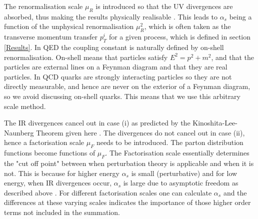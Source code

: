 \documentclass[12pt, onecolumn]{revtex4}    %
\begin{document}
The renormalisation scale ${\mu_R}$ is introduced so that the UV divergences are absorbed, thus making the results physically realisable \cite{PHD}. This leads to ${\alpha _s}$ being a function of the unphysical renormalisation ${\mu_R^2}$, which is often taken as the transverse momentum transfer ${p_T^i}$ for a given process, which is defined in section \ref{Results}. In QED the coupling constant is naturally defined by on-shell renormalisation. On-shell means that particles satisfy ${E^2 = p^2 + m^2}$, and that the particles are external lines on a Feynman diagram and that they are real particles. In QCD quarks are strongly interacting particles so they are not directly measurable, and hence are never on the exterior of a Feynman diagram, so we avoid discussing on-shell quarks. This means that we use this arbitrary scale method. 

The IR divergences cancel out in case (i) as predicted by the Kinoshita-Lee-Naunberg Theorem given here \cite{KNL}. The divergences do not cancel out in case (ii), hence a factorisation scale ${\mu_F}$ needs to be introduced. The parton distribution functions become functions of ${\mu_F}$. The Factorisation scale essentially determines the "cut off point" between when perturbation theory is applicable and when it is not. This is because for higher energy ${\alpha _s}$ is small (perturbative) and for low energy, when IR divergences occur, ${\alpha _s}$ is large due to asymptotic freedom as described above \cite{DMP}. For different factorisation scales one can calculate ${\alpha _s}$ and the differences at these varying scales indicates the importance of those higher order terms not included in the summation.
 
\end{document}
